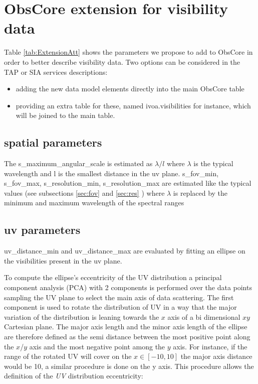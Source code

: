 \documentclass[11pt,a4paper]{ivoa}
\begin{document}
\section{ObsCore extension for visibility data}

Table \ref{tab:ExtensionAtt} shows the %
parameters we propose to add to ObsCore in order to better describe visibility data.
Two options can be considered in the TAP or SIA services descriptions: 
\begin{itemize}
\item adding the new data model elements directly into the main ObsCore table
\item providing an extra table for these, named ivoa.visibilities for instance,  which will 
be joined to the main table. 
\end{itemize}

\subsection{spatial parameters}

The s\_maximum\_angular\_scale is estimated as $\lambda/l$ where $\lambda$ is the typical 
wavelength and l is the smallest distance in the uv plane. s\_fov\_min, s\_fov\_max, 
s\_resolution\_min, s\_resolution\_max are estimated like the typical values (see subsections 
\ref{sec:fov} and \ref{sec:res} ) where $\lambda$ is replaced by the minimum and maximum 
wavelength of the spectral ranges


\subsection{uv parameters}

uv\_distance\_min and uv\_distance\_max are evaluated by fitting an ellipse on the 
visibilities present in the uv plane.

To compute the ellipse's eccentricity of the UV distribution a principal component analysis 
(PCA) with 2 components is performed over the data points sampling the UV plane to select the 
main axis of data scattering. 
The first component is used to rotate the distribution of UV in a way that the major variation 
of the distribution is leaning towards the $x$ axis of a bi dimensional $xy$ Cartesian plane. 
The major axis length and the minor axis length of the ellipse are therefore defined as the 
semi distance between the most positive point along the $x$/$y$ axis and the most negative point 
among the $y$ axis. For instance, if the range of the rotated UV will cover on the $x \in [-10, 
10]$ the major axis distance would be 10, a similar procedure is done on the y axis. This 
procedure allows the definition of the \emph{UV} distribution eccentricity:
\end{document}
